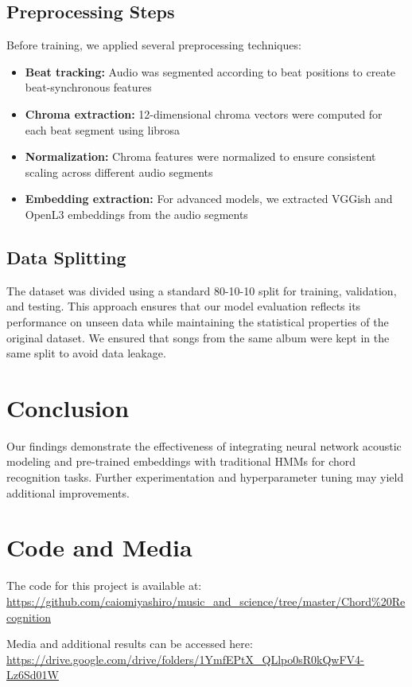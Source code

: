 \documentclass{article}
\begin{document}
\subsection{Preprocessing Steps}
Before training, we applied several preprocessing techniques:
\begin{itemize}
    \item \textbf{Beat tracking:} Audio was segmented according to beat positions to create 
      beat-synchronous features
    \item \textbf{Chroma extraction:} 12-dimensional chroma vectors were computed for each beat 
      segment using librosa
    \item \textbf{Normalization:} Chroma features were normalized to ensure consistent scaling 
      across different audio segments
    \item \textbf{Embedding extraction:} For advanced models, we extracted VGGish and OpenL3 
      embeddings from the audio segments
\end{itemize}

\subsection{Data Splitting}
The dataset was divided using a standard 80-10-10 split for training, validation, and testing. 
This approach ensures that our model evaluation reflects its performance on unseen data while 
maintaining the statistical properties of the original dataset. We ensured that songs from the 
same album were kept in the same split to avoid data leakage.

\section{Conclusion}
Our findings demonstrate the effectiveness of integrating neural network acoustic modeling and pre-trained embeddings with traditional HMMs for chord recognition tasks. Further experimentation and hyperparameter tuning may yield additional improvements.

\section*{Code and Media}
The code for this project is available at: \url{https://github.com/caiomiyashiro/music_and_science/tree/master/Chord\%20Recognition}

Media and additional results can be accessed here: \url{https://drive.google.com/drive/folders/1YmfEPtX_QLlpo0sR0kQwFV4-Lz6Sd01W}



\end{document}
